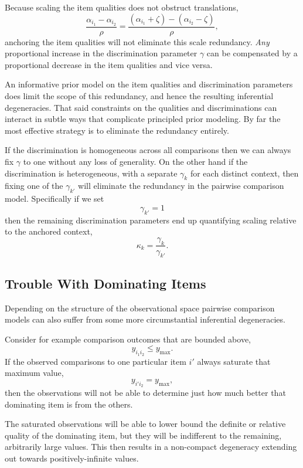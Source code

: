 \documentclass[
  letterpaper,
  DIV=11,
  numbers=noendperiod]{scrartcl}
\begin{document}
Because scaling the item qualities does not obstruct translations, \[
\frac{\alpha_{i_{1}} - \alpha_{i_{2}}}{\rho}
=
\frac{ (\alpha_{i_{1}} + \zeta) - (\alpha_{i_{2}} - \zeta)}{\rho},
\] anchoring the item qualities will not eliminate this scale
redundancy. \emph{Any} proportional increase in the discrimination
parameter \(\gamma\) can be compensated by a proportional decrease in
the item qualities and vice versa.

An informative prior model on the item qualities and discrimination
parameters does limit the scope of this redundancy, and hence the
resulting inferential degeneracies. That said constraints on the
qualities and discriminations can interact in subtle ways that
complicate principled prior modeling. By far the most effective strategy
is to eliminate the redundancy entirely.

If the discrimination is homogeneous across all comparisons then we can
always fix \(\gamma\) to one without any loss of generality. On the
other hand if the discrimination is heterogeneous, with a separate
\(\gamma_{k}\) for each distinct context, then fixing one of the
\(\gamma_{k'}\) will eliminate the redundancy in the pairwise comparison
model. Specifically if we set \[
\gamma_{k'} = 1
\] then the remaining discrimination parameters end up quantifying
scaling relative to the anchored context, \[
\kappa_{k} = \frac{ \gamma_{k} }{ \gamma_{k'} }.
\]

\subsection{Trouble With Dominating
Items}\label{trouble-with-dominating-items}

Depending on the structure of the observational space pairwise
comparison models can also suffer from some more circumstantial
inferential degeneracies.

Consider for example comparison outcomes that are bounded above, \[
y_{i_{1} i_{2}} \le y_{\max}.
\] If the observed comparisons to one particular item \(i'\) always
saturate that maximum value, \[
y_{i' i_{2}} = y_{\max},
\] then the observations will not be able to determine just how much
better that dominating item is from the others.

The saturated observations will be able to lower bound the definite or
relative quality of the dominating item, but they will be indifferent to
the remaining, arbitrarily large values. This then results in a
non-compact degeneracy extending out towards positively-infinite values.
\end{document}
